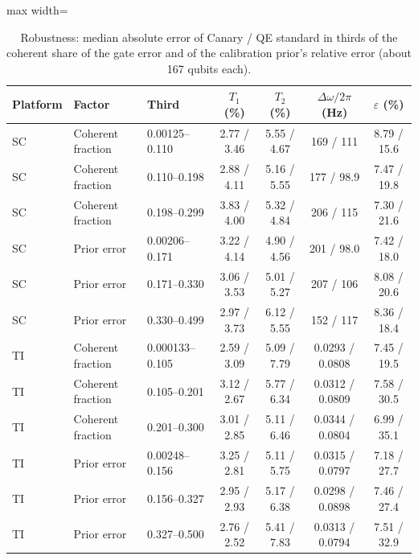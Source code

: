 \begin{table}[!t]
\centering
\footnotesize
\caption{Robustness: median absolute error of Canary / QE standard in thirds of the coherent share of the gate error and of the calibration prior's relative error (about 167 qubits each).}
\label{tab:s3}
\begin{adjustbox}{max width=\linewidth}
\begin{tabular}{lllcccc}
\hline
Platform & Factor & Third & $T_1$ (\%) & $T_2$ (\%) & $\Delta\omega/2\pi$ (Hz) & $\varepsilon$ (\%) \\
\hline
SC & Coherent fraction & 0.00125--0.110 & 2.77 / 3.46 & 5.55 / 4.67 & 169 / 111 & 8.79 / 15.6 \\
SC & Coherent fraction & 0.110--0.198 & 2.88 / 4.11 & 5.16 / 5.55 & 177 / 98.9 & 7.47 / 19.8 \\
SC & Coherent fraction & 0.198--0.299 & 3.83 / 4.00 & 5.32 / 4.84 & 206 / 115 & 7.30 / 21.6 \\
SC & Prior error & 0.00206--0.171 & 3.22 / 4.14 & 4.90 / 4.56 & 201 / 98.0 & 7.42 / 18.0 \\
SC & Prior error & 0.171--0.330 & 3.06 / 3.53 & 5.01 / 5.27 & 207 / 106 & 8.08 / 20.6 \\
SC & Prior error & 0.330--0.499 & 2.97 / 3.73 & 6.12 / 5.55 & 152 / 117 & 8.36 / 18.4 \\
\hline
TI & Coherent fraction & 0.000133--0.105 & 2.59 / 3.09 & 5.09 / 7.79 & 0.0293 / 0.0808 & 7.45 / 19.5 \\
TI & Coherent fraction & 0.105--0.201 & 3.12 / 2.67 & 5.77 / 6.34 & 0.0312 / 0.0809 & 7.58 / 30.5 \\
TI & Coherent fraction & 0.201--0.300 & 3.01 / 2.85 & 5.11 / 6.46 & 0.0344 / 0.0804 & 6.99 / 35.1 \\
TI & Prior error & 0.00248--0.156 & 3.25 / 2.81 & 5.11 / 5.75 & 0.0315 / 0.0797 & 7.18 / 27.7 \\
TI & Prior error & 0.156--0.327 & 2.95 / 2.93 & 5.17 / 6.38 & 0.0298 / 0.0898 & 7.46 / 27.4 \\
TI & Prior error & 0.327--0.500 & 2.76 / 2.52 & 5.41 / 7.83 & 0.0313 / 0.0794 & 7.51 / 32.9 \\
\hline
\end{tabular}
\end{adjustbox}
\end{table}

